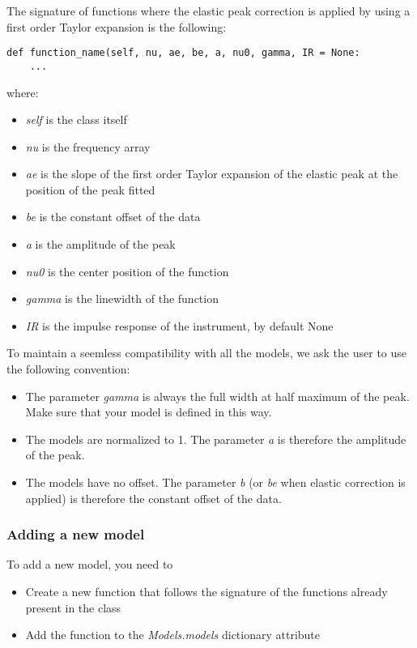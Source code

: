 The signature of functions where the elastic peak correction is applied by using a first order Taylor expansion is the following:
\begin{lstlisting}
def function_name(self, nu, ae, be, a, nu0, gamma, IR = None:
    ...
\end{lstlisting}

where:
\begin{itemize}
    \item \textit{self} is the class itself
    \item \textit{nu} is the frequency array
    \item \textit{ae} is the slope of the first order Taylor expansion of the elastic peak at the position of the peak fitted
    \item \textit{be} is the constant offset of the data
    \item \textit{a} is the amplitude of the peak
    \item \textit{nu0} is the center position of the function
    \item \textit{gamma} is the linewidth of the function        
    \item \textit{IR} is the impulse response of the instrument, by default None
\end{itemize}

To maintain a seemless compatibility with all the models, we ask the user to use the following convention:
\begin{itemize}
    \item The parameter \textit{gamma} is always the full width at half maximum of the peak. Make sure that your model is defined in this way.
    \item The models are normalized to 1. The parameter \textit{a} is therefore the amplitude of the peak.
    \item The models have no offset. The parameter \textit{b} (or \textit{be} when elastic correction is applied) is therefore the constant offset of the data.
\end{itemize}

\subsubsection{Adding a new model}

To add a new model, you need to 
\begin{itemize}
    \item Create a new function that follows the signature of the functions already present in the class
    \item Add the function to the \textit{Models.models} dictionary attribute
\end{itemize}

